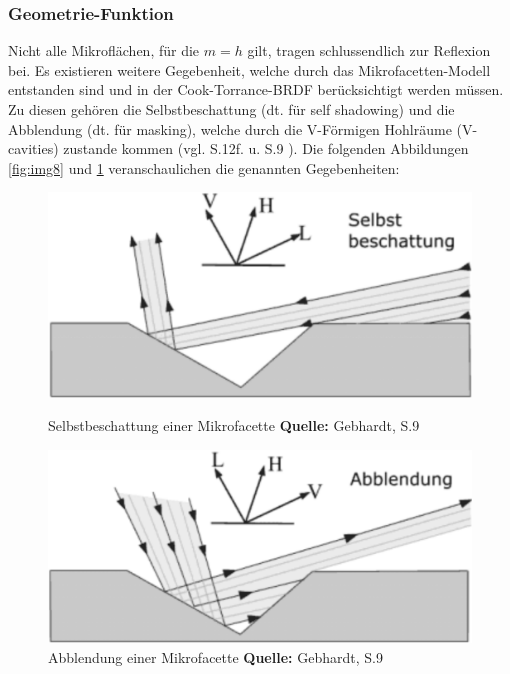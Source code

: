 \documentclass[
  11pt,
  a4paper,
  oneside
  ]{article}
\begin{document}
\subsubsection{Geometrie-Funktion}
Nicht alle Mikroflächen, für die $m = h$ gilt, tragen schlussendlich zur Reflexion bei. Es existieren weitere Gegebenheit, welche durch das Mikrofacetten-Modell entstanden sind und in der Cook-Torrance-BRDF berücksichtigt werden müssen. Zu diesen gehören die Selbstbeschattung (dt. für self shadowing) und die Abblendung (dt. für masking), welche durch die V-Förmigen Hohlräume (V-cavities) zustande kommen 
(vgl. S.12f. \cite{rtrPaper} u. S.9 \cite{irrlichtOrg}). Die folgenden Abbildungen \ref{fig:img8} und \ref{fig:img9} veranschaulichen die genannten Gegebenheiten: 
\begin{figure}[H]
  \centering
  \begin{minipage}{.48\textwidth}
    \centering
    \includegraphics*[width=1\linewidth]{images/selstbeschattung.png}
    \caption{Selbstbeschattung einer Mikrofacette \footnotesize\textbf{Quelle:} Gebhardt, S.9  \cite{irrlichtOrg}}
    \label{fig:img8} 
  \end{minipage}%
  \hfill
  \begin{minipage}{.48\textwidth}
    \centering
    \includegraphics*[width=1\linewidth]{images/abblendung.png}
    \caption{Abblendung einer Mikrofacette \footnotesize\textbf{Quelle:} Gebhardt, S.9 \cite{irrlichtOrg}}
    \label{fig:img9}
  \end{minipage}
\end{figure}
\end{document}
